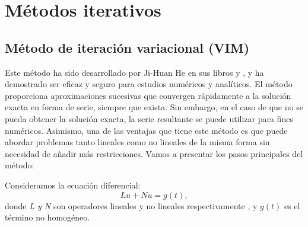 \section{Métodos iterativos}

\subsection{Método de iteración variacional (VIM)}
Este método ha sido desarrollado por Ji-Huan He en sus libros \cite{VIM1} y \cite{VIM2}, y ha demostrado ser eficaz y seguro para estudios numéricos y analíticos. El método proporciona aproximaciones sucesivas que convergen rápidamente a la solución exacta en forma de serie, siempre que exista. Sin embargo, en el caso de que no se pueda obtener la solución exacta, la serie resultante se puede utilizar para fines numéricos. Asimismo, una de las ventajas que tiene este método es que puede abordar problemas tanto lineales como no lineales de la misma forma sin necesidad de añadir más restricciones. Vamos a presentar los pasos principales del método:

Consideramos la ecuación diferencial:
\begin{equation}\label{eq:miv1}
	Lu + Nu = g(t),
\end{equation}
donde \textit{L y N} son operadores lineales y no lineales respectivamente , y $g(t)$ es el término no homogéneo.

